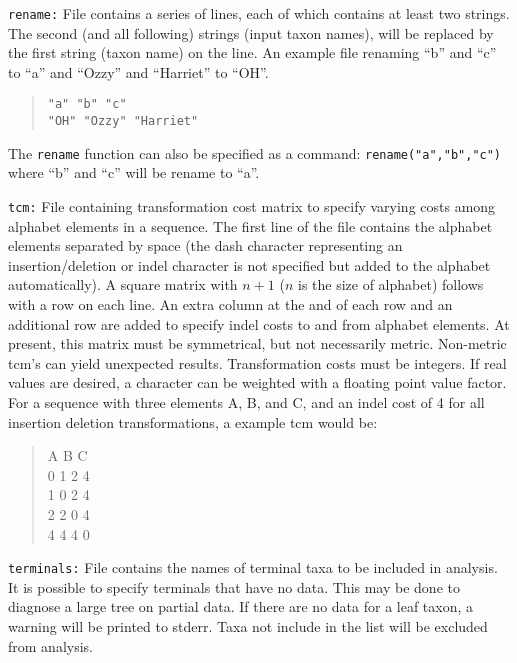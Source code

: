\documentclass[11pt]{article}
\begin{document}
			\smallskip		
			\noindent \texttt{rename:} File contains a series of lines, each of which contains at least two strings.  The second (and all following) strings (input taxon names),
			will be replaced by the first string (taxon name) on the line. An example file renaming ``b'' and ``c''  to ``a'' and ``Ozzy'' and ``Harriet'' to ``OH''.
				\begin{quote}
				\texttt{"a" "b" "c"}\\
				\texttt{"OH" "Ozzy" "Harriet"}
			\end{quote}
		
			 The \texttt{rename} function can also be specified as a command:  \texttt{rename("a","b","c")} where ``b'' and ``c'' will be rename to ``a''. 
			 
			\smallskip		
			\noindent \texttt{tcm:} File containing transformation cost matrix to specify varying costs among alphabet elements in a sequence.  The first line of the file 
			contains the alphabet elements separated by space (the dash character representing an insertion/deletion or indel character is not specified but added to the alphabet automatically).
			A square matrix with $n + 1$ ($n$ is the size of alphabet) follows with a row on each line.  An extra column at the and of each row and an additional row are 
			added to specify indel costs to and from alphabet elements.  At present, this matrix must be symmetrical, but not necessarily metric.  Non-metric tcm's can
			yield unexpected results. Transformation costs must be integers.  If real values are desired, a character can be weighted with a floating point value factor. For a sequence with three elements A, B, and C,  and an indel cost of 4 for all insertion deletion transformations, a example tcm would  be:
			\begin{quote}
			A B C\\
			0 1 2 4\\
			1 0 2 4\\
			2 2 0 4\\
		    4 4 4 0\\
	   		 \end{quote}
   		 
   		 	\smallskip		
   		 	\noindent \texttt{terminals:}  File contains the names of terminal taxa to be included in analysis.  It is possible to specify terminals that have no data.  This may be done to diagnose a large tree on partial data.  If there are no data for a leaf taxon, a warning will be printed to stderr.  Taxa not include in the list will be excluded from analysis. 
	   
\end{document}
